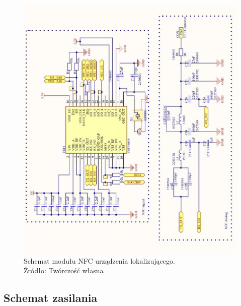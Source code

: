 \begin{figure}[H]
	\centering
	\includegraphics[width=14cm]{img/schematics/mainboard_NFC.jpg}
	\caption{Schemat modułu NFC urządzenia lokalizującego. \\ Źródło: Twórczość własna}
	\label{fig:image_mainboard_NFC_schematic}
\end{figure}



\subsection{Schemat zasilania}


